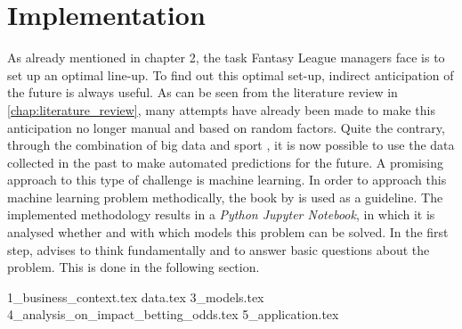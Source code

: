 \chapter{Implementation}

As already mentioned in chapter 2, the task Fantasy League managers face is to set up an optimal line-up. To find out this optimal set-up, indirect anticipation of the future is always useful. As can be seen from the literature review in \autoref{chap:literature_review}, many attempts have already been made to make this anticipation no longer manual and based on random factors. Quite the contrary, through the combination of big data and sport \parencite[][cf.]{rein_big_2016}, it is now possible to use the data collected in the past to make automated predictions for the future. A promising approach to this type of challenge is machine learning. In order to approach this machine learning problem methodically, the book  by \citeauthor{geron_hands-machine_2019} is used as a guideline. The implemented methodology results in a \emph{Python Jupyter Notebook}, in which it is analysed whether and with which models this problem can be solved. In the first step, \citeauthor{geron_hands-machine_2019} advises to think fundamentally and to answer basic questions about the problem. This is done in the following section.

{1_business_context.tex}
{data.tex}
{3_models.tex}
{4_analysis_on_impact_betting_odds.tex}
{5_application.tex}



